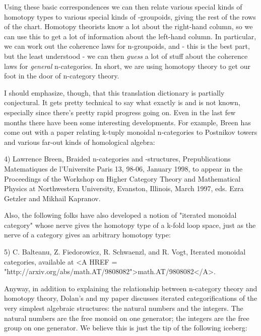 Using these basic correspondences we can then relate various special
kinds of homotopy types to various special kinds of \omega -groupoids,
giving the rest of the rows of the chart.  Homotopy theorists know a
lot about the right-hand column, so we can use this to get a lot of
information about the left-hand column.  In particular, we can work
out the coherence laws for n-groupoids, and - this is the best part,
but the least understood - we can then \emph{guess} a lot of stuff about
the coherence laws for \emph{general} n-categories.  In short, we are using
homotopy theory to get our foot in the door of n-category theory.

I should emphasize, though, that this translation dictionary is
partially conjectural.  It gets pretty technical to say what exactly
is and is not known, especially since there's pretty rapid progress
going on.  Even in the last few months there have been some
interesting developments.  For example, Breen has come out with a
paper relating k-tuply monoidal n-categories to Postnikov towers and
various far-out kinds of homological algebra:

4) Lawrence Breen, Braided n-categories and \Sigma -structures,
Prepublications Matematiques de l'Universite Paris 13, 98-06,
January 1998, to appear in the Proceedings of the Workshop on
Higher Category Theory and Mathematical Physics at Northwestern
University, Evanston, Illinois, March 1997, eds. Ezra Getzler
and Mikhail Kapranov.

Also, the following folks have also developed a notion of "iterated
monoidal category" whose nerve gives the homotopy type of a k-fold
loop space, just as the nerve of a category gives an arbitrary
homotopy type:

5) C. Balteanu, Z. Fiedorowicz, R. Schwaenzl, and R. Vogt, Iterated
monoidal categories, available at <A HREF = 
"http://arxiv.org/abs/math.AT/9808082">math.AT/9808082</A>.

Anyway, in addition to explaining the relationship between n-category
theory and homotopy theory, Dolan's and my paper discusses iterated
categorifications of the very simplest algebraic structures: the
natural numbers and the integers.  The natural numbers are the free
monoid on one generator; the integers are the free group on one
generator.  We believe this is just the tip of the following iceberg:



